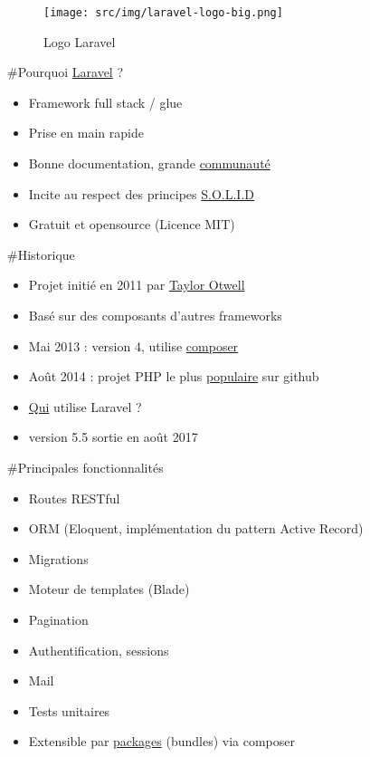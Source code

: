 \begin{figure}
\centering
\texttt{[image: src/img/laravel-logo-big.png]}
\caption{Logo Laravel}
\end{figure}

\#Pourquoi \href{https://laravel.com/}{Laravel} ?

\begin{itemize}
\tightlist
\item
  Framework full stack / glue
\item
  Prise en main rapide
\item
  Bonne documentation, grande \href{http://laravel.io/forum}{communauté}
\item
  Incite au respect des principes
  \href{http://fr.wikipedia.org/wiki/SOLID_(informatique)}{S.O.L.I.D}
\item
  Gratuit et opensource (Licence MIT)
\end{itemize}

\#Historique

\begin{itemize}
\tightlist
\item
  Projet initié en 2011 par \href{http://taylorotwell.com/}{Taylor
  Otwell}
\item
  Basé sur des composants d'autres frameworks
\item
  Mai 2013 : version 4, utilise
  \href{https://getcomposer.org/}{composer}
\item
  Août 2014 : projet PHP le plus
  \href{https://github.com/search?l=PHP\&q=stars\%3A\%3E0\&ref=searchresults\&type=Repositories}{populaire}
  sur github
\item
  \href{http://builtwithlaravel.com/}{Qui} utilise Laravel ?
\item
  version 5.5 sortie en août 2017
\end{itemize}

\#Principales fonctionnalités

\begin{itemize}
\tightlist
\item
  Routes RESTful
\item
  ORM (Eloquent, implémentation du pattern Active Record)
\item
  Migrations
\item
  Moteur de templates (Blade)
\item
  Pagination
\item
  Authentification, sessions
\item
  Mail
\item
  Tests unitaires
\item
  Extensible par \href{http://packalyst.com/}{packages} (bundles) via
  composer
\end{itemize}

